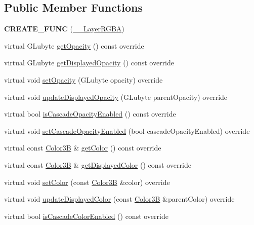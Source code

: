 \subsection*{Public Member Functions}
\begin{DoxyCompactItemize}
\item 
\mbox{\label{class____LayerRGBA_abc16c928f11f7890c5203eb2a101c13f}} 
{\bfseries C\+R\+E\+A\+T\+E\+\_\+\+F\+U\+NC} (\hyperlink{class____LayerRGBA}{\+\_\+\+\_\+\+Layer\+R\+G\+BA})
\item 
virtual G\+Lubyte \hyperlink{class____LayerRGBA_a61d071eeff8bc1c46520611261f5dd1a}{get\+Opacity} () const override
\item 
virtual G\+Lubyte \hyperlink{class____LayerRGBA_a3c94f57397e6c53127d1176d14ab25fe}{get\+Displayed\+Opacity} () const override
\item 
virtual void \hyperlink{class____LayerRGBA_a1b172623ee7486835fd189672d19d8d7}{set\+Opacity} (G\+Lubyte opacity) override
\item 
virtual void \hyperlink{class____LayerRGBA_a53e78a19fb9780fec84476f1bce1d3f6}{update\+Displayed\+Opacity} (G\+Lubyte parent\+Opacity) override
\item 
virtual bool \hyperlink{class____LayerRGBA_a3dd348cf39ca267d7c0ebb5000dce45e}{is\+Cascade\+Opacity\+Enabled} () const override
\item 
virtual void \hyperlink{class____LayerRGBA_ab25a8418f19d14a064f8c8072b3468a5}{set\+Cascade\+Opacity\+Enabled} (bool cascade\+Opacity\+Enabled) override
\item 
virtual const \hyperlink{structColor3B}{Color3B} \& \hyperlink{class____LayerRGBA_ab14530232cae13fbf4399e0a47daa315}{get\+Color} () const override
\item 
virtual const \hyperlink{structColor3B}{Color3B} \& \hyperlink{class____LayerRGBA_a621d9a8fe47abd33ec00bd3754bf6ec2}{get\+Displayed\+Color} () const override
\item 
virtual void \hyperlink{class____LayerRGBA_aed346ddd9f7f7eab1e3d1417fa9a9831}{set\+Color} (const \hyperlink{structColor3B}{Color3B} \&color) override
\item 
virtual void \hyperlink{class____LayerRGBA_aa0406779f58fc6586f51129bee7aed36}{update\+Displayed\+Color} (const \hyperlink{structColor3B}{Color3B} \&parent\+Color) override
\item 
virtual bool \hyperlink{class____LayerRGBA_abc02efad9eb89df47e6a0365dc9c784e}{is\+Cascade\+Color\+Enabled} () const override

\end{DoxyCompactItemize}

